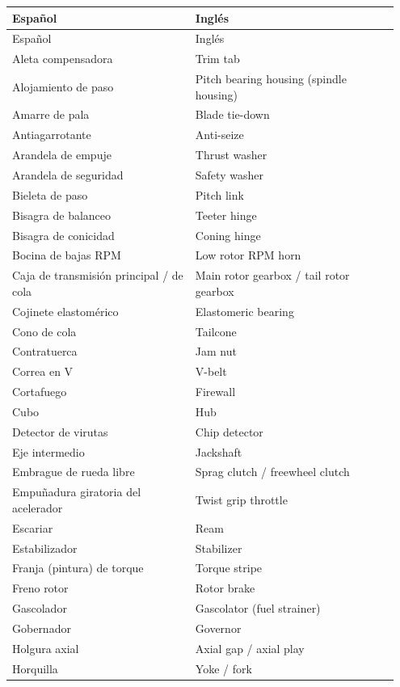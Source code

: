 {\small
\begin{longtable}{@{}>{\raggedright\arraybackslash}p{0.45\linewidth}>{\raggedright\arraybackslash}p{0.5\linewidth}@{}}
\toprule
Español & Inglés \\
\midrule
\endfirsthead
\toprule
Español & Inglés \\
\midrule
\endhead
\bottomrule
\endfoot
Aleta compensadora & Trim tab \\
Alojamiento de paso & Pitch bearing housing (spindle housing) \\
Amarre de pala & Blade tie-down \\
Antiagarrotante & Anti-seize \\
Arandela de empuje & Thrust washer \\
Arandela de seguridad & Safety washer \\
Bieleta de paso & Pitch link \\
Bisagra de balanceo & Teeter hinge \\
Bisagra de conicidad & Coning hinge \\
Bocina de bajas RPM & Low rotor RPM horn \\
Caja de transmisión principal / de cola & Main rotor gearbox / tail rotor gearbox \\
Cojinete elastomérico & Elastomeric bearing \\
Cono de cola & Tailcone \\
Contratuerca & Jam nut \\
Correa en V & V-belt \\
Cortafuego & Firewall \\
Cubo & Hub \\
Detector de virutas & Chip detector \\
Eje intermedio & Jackshaft \\
Embrague de rueda libre & Sprag clutch / freewheel clutch \\
Empuñadura giratoria del acelerador & Twist grip throttle \\
Escariar & Ream \\
Estabilizador & Stabilizer \\
Franja (pintura) de torque & Torque stripe \\
Freno rotor & Rotor brake \\
Gascolador & Gascolator (fuel strainer) \\
Gobernador & Governor \\
Holgura axial & Axial gap / axial play \\
Horquilla & Yoke / fork \\

\end{longtable}}
